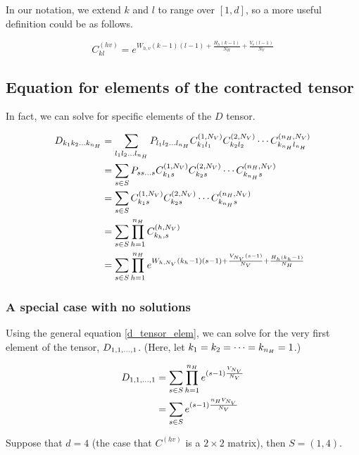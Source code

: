 \documentclass[11pt]{article}
\begin{document}
In our notation, we extend \(k\) and \(l\) to range over \([1, d] \), so a more useful definition could be as follows.

\begin{equation}
C^{(hv)}_{k l} = e^{{W}_{h,v} (k - 1) (l - 1) + \frac{{H}_{h} (k - 1)}{N_H} + \frac{{V}_{v} (l - 1)}{N_V}}
\end{equation}


\subsection{Equation for elements of the contracted tensor}
\label{sec:org32ad07f}

In fact, we can solve for specific elements of the \(D\) tensor.

\begin{align}
D_{k_1k_2 \dots k_{n_H}} &= \sum_{l_1l_2 \dots l_{n_H}} P_{l_1l_2 \dots l_{n_H}} C^{(1,N_V)}_{k_1 l_1} C^{(2,N_V)}_{k_2 l_2} \cdots C^{(n_H,N_V)}_{k_{n_H} l_{n_H}} \\
  &= \sum_{s \in S} P_{ss \dots s} C^{(1,N_V)}_{k_1 s} C^{(2,N_V)}_{k_2 s} \cdots C^{(n_H,N_V)}_{k_{n_H} s} \\
  &= \sum_{s \in S} C^{(1,N_V)}_{k_1 s} C^{(2,N_V)}_{k_2 s} \cdots C^{(n_H,N_V)}_{k_{n_H} s} \\
  &= \sum_{s \in S} \prod_{h=1}^{n_H} C^{(h,N_V)}_{k_h, s} \label{d_tensor_matrix_elem} \\
  &= \sum_{s \in S} \prod_{h=1}^{n_H} e^{{W}_{h,N_{V}} ({k}_{h} - 1 )(s - 1) + \frac{{V}_{N_{V}} (s - 1)}{N_{V}}  + \frac{{H}_{h} ({k}_{h} - 1)}{N_{H}}} \label{d_tensor_elem}
\end{align}

\subsubsection{A special case with no solutions}
\label{sec:orgf5dd7e0}
Using the general equation \eqref{d_tensor_elem}, we can solve for the very first element of the tensor, \(D_{1, 1, \dots, 1}\). (Here, let \(k_1 = k_2 = \dots = k_{n_H} = 1\).)

\begin{align}
 D_{1, 1, \dots, 1} &= \sum_{s \in S} \prod_{h=1}^{n_H} e^{ (s -1) \frac{V_{N_V}}{N_V} } \\
    &= \sum_{s \in S} e^{ (s -1) \frac{n_H V_{N_V}}{N_V} } \label{d_tensor_first_elem}
\end{align}

Suppose that \(d = 4\) (the case that \(C^{(hv)}\) is a \(2 \times 2\) matrix), then \(S = (1, 4)\).
\end{document}
